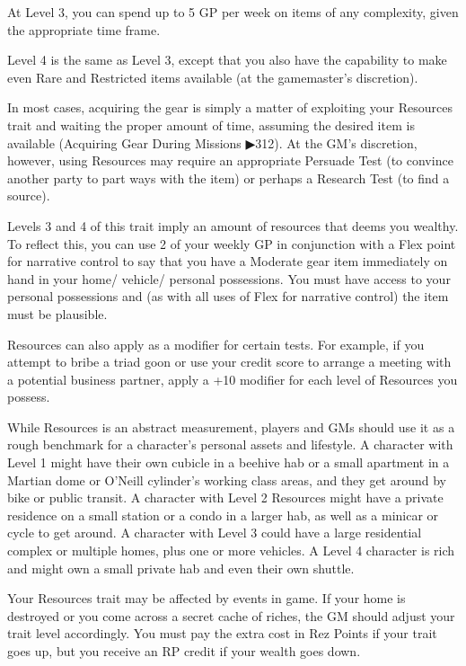 \begin{enumerate}
    At Level 3, you can spend up to 5 GP per week on items of any complexity, given the appropriate time frame.
    
    Level 4 is the same as Level 3, except that you also have the capability to make even Rare and Restricted items available (at the gamemaster's discretion).
    
    In most cases, acquiring the gear is simply a matter of exploiting your Resources trait and waiting the proper amount of time, assuming the desired item is available (Acquiring Gear During Missions ▶312). At the GM’s discretion, however, using Resources may require an appropriate Persuade Test (to convince another party to part ways with the item) or perhaps a Research Test (to find a source).
    
    Levels 3 and 4 of this trait imply an amount of resources that deems you wealthy. To reflect this, you can use 2 of your weekly GP in conjunction with a Flex point for narrative control to say that you have a Moderate gear item immediately on hand in your home/ vehicle/ personal possessions. You must have access to your personal possessions and (as with all uses of Flex for narrative control) the item must be plausible.
    
    Resources can also apply as a modifier for certain tests. For example, if you attempt to bribe a triad goon or use your credit score to arrange a meeting with a potential business partner, apply a +10 modifier for each level of Resources you possess.
    
    While Resources is an abstract measurement, players and GMs should use it as a rough benchmark for a character’s personal assets and lifestyle. A character with Level 1 might have their own cubicle in a beehive hab or a small apartment in a Martian dome or O’Neill cylinder’s working class areas, and they get around by bike or public transit. A character with Level 2 Resources might have a private residence on a small station or a condo in a larger hab, as well as a minicar or cycle to get around. A character with Level 3 could have a large residential complex or multiple homes, plus one or more vehicles. A Level 4 character is rich and might own a small private hab and even their own shuttle.
    
    Your Resources trait may be affected by events in game. If your home is destroyed or you come across a secret cache of riches, the GM should adjust your trait level accordingly. You must pay the extra cost in Rez Points if your trait goes up, but you receive an RP credit if your wealth goes down.
    

\end{enumerate}
